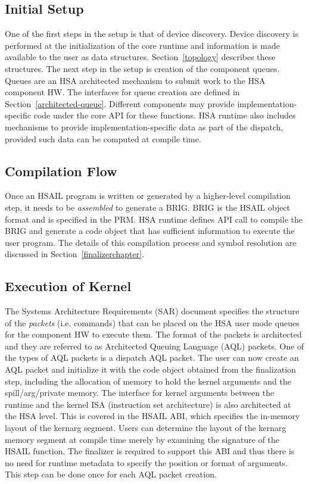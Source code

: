 \documentclass[draft]{book}
\begin{document}
\subsection{Initial Setup}
One of the first steps in the setup is that of device discovery. Device
discovery is performed at the initialization of the core runtime and information
is made available to the user as data structures. Section~\ref{topology}
describes these structures. The next step in the setup is creation of the
component queues. Queues are an HSA architected mechanism to submit work to the
HSA component HW. The interfaces for queue creation are defined in
Section~\ref{architected-queue}. Different components may provide
implementation-\/specific code under the core API for these functions. HSA
runtime also includes mechanisms to provide implementation-\/specific data as
part of the dispatch, provided such data can be computed at compile time.

\subsection{Compilation Flow}
Once an HSAIL program is written or generated by a higher-level compilation
step, it needs to be \emph{assembled} to generate a BRIG. BRIG is the HSAIL
object format and is specified in the PRM. HSA runtime defines API call to
compile the BRIG and generate a code object that has sufficient information to
execute the user program. The details of this compilation process and symbol
resolution are discussed in Section~\ref{finalizerchapter}.

\subsection{Execution of Kernel}
The Systems Architecture Requirements (SAR) document specifies the structure of
the \emph{packets} (i.e. commands) that can be placed on the HSA user mode
queues for the component HW to execute them. The format of the packets is
architected and they are referred to as Architected Queuing Language (AQL)
packets. One of the types of AQL packets is a dispatch AQL packet. The user can
now create an AQL packet and initialize it with the code object obtained from
the finalization step, including the allocation of memory to hold the kernel
arguments and the spill/arg/private memory. The interface for kernel arguments
between the runtime and the kernel ISA (instruction set architecture) is also
architected at the HSA level. This is covered in the HSAIL ABI, which specifies
the in-\/memory layout of the kernarg segment. Users can determine the layout of
the kernarg memory segment at compile time merely by examining the signature of
the HSAIL function. The finalizer is required to support this ABI and thus there
is no need for runtime metadata to specify the position or format of arguments.
This step can be done once for each AQL packet creation.
\end{document}
